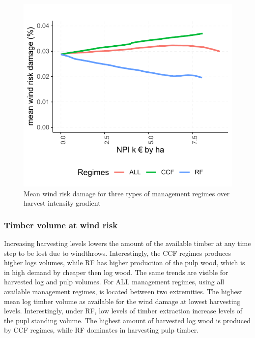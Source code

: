 \documentclass[]{elsarticle} %
\makeatletter
\def\maxwidth{\ifdim\Gin@nat@width>\linewidth\linewidth
\else\Gin@nat@width\fi}
\let\Oldincludegraphics\includegraphics
\renewcommand{\includegraphics}[1]{\Oldincludegraphics[width=\maxwidth]{#1}}
\makeatother
\begin{document}
\begin{figure}
\centering
\includegraphics{test_manus_files/figure-latex/fig3_mean_risk_by_intensity_plot-1.pdf}
\caption{Mean wind risk damage for three types of management regimes
over harvest intensity gradient}
\end{figure}

\subsubsection{Timber volume at wind
risk}\label{timber-volume-at-wind-risk}

Increasing harvesting levels lowers the amount of the available timber
at any time step to be lost due to windthrows. Interestingly, the CCF
regimes produces higher logs volumes, while RF has higher production of
the pulp wood, which is in high demand by cheaper then log wood. The
same trends are visible for harvested log and pulp volumes. For ALL
management regimes, using all available management regimes, is located
between two extremities. The highest mean log timber volume as available
for the wind damage at lowest harvesting levels. Interestingly, under
RF, low levels of timber extraction increase levels of the pupl standing
volume. The highest amount of harvested log wood is produced by CCF
regimes, while RF dominates in harvesting pulp timber.
\end{document}

